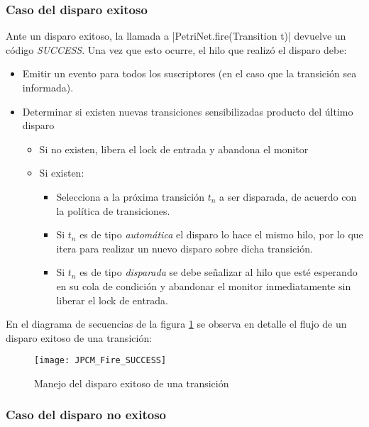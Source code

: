 \subsubsection*{Caso del disparo exitoso}
Ante un disparo exitoso, la llamada a |PetriNet.fire(Transition t)|
devuelve un código \textit{SUCCESS}. Una vez que esto ocurre, el hilo que
realizó el disparo debe:
\begin{itemize}
  \item Emitir un evento para todos los suscriptores (en el caso que la
  transición sea informada).
  \item Determinar si existen nuevas transiciones sensibilizadas producto del
  último disparo
      \begin{itemize}
        \item Si no existen, libera el lock de entrada y abandona el monitor
        \item Si existen:
            \begin{itemize}
                \item Selecciona a la próxima transición $t_{n}$ a ser
                disparada, de acuerdo con la política de transiciones.
                \item Si $t_{n}$ es de tipo \textit{automática} el disparo lo
                hace el mismo hilo, por lo que itera para realizar un nuevo
                disparo sobre dicha transición.
                \item Si $t_{n}$ es de tipo \textit{disparada} se debe
                señalizar al hilo que esté esperando en su cola de condición y
                abandonar el monitor inmediatamente sin liberar el lock de entrada.
            \end{itemize}
      \end{itemize}
\end{itemize}

En el diagrama de secuencias de la figura \ref{fig:JPCM_Fire_SUCCESS} se observa
en detalle el flujo de un disparo exitoso de una transición:

\begin{figure}[H]
  \centering
  \texttt{[image: JPCM\_Fire\_SUCCESS]}
  \caption{Manejo del disparo exitoso de una transición}
  \label{fig:JPCM_Fire_SUCCESS}
\end{figure}

\subsubsection*{Caso del disparo no exitoso}

